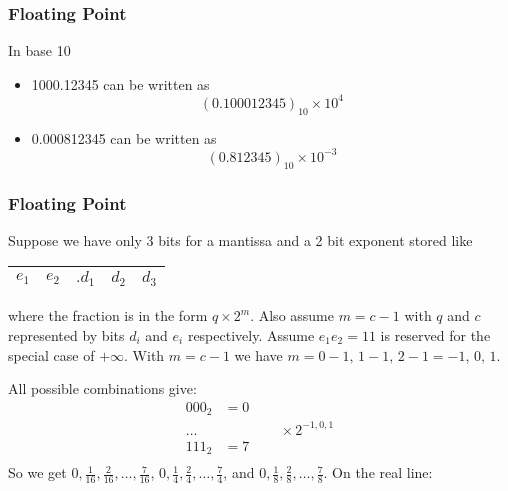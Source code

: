 \documentclass[10pt]{beamer}
\begin{document}
\begin{frame}
\frametitle{Floating Point}
\begin{example}
  In base 10
\begin{itemize}
  \item 1000.12345 can be written as
\begin{equation*}
  (0.100012345)_{10} \times 10^4
\end{equation*}
  \item 0.000812345 can be written as
\begin{equation*}
  (0.812345)_{10} \times 10^{-3}
\end{equation*}
\end{itemize}
\end{example}
\end{frame}
\begin{frame}
\frametitle{Floating Point}
  Suppose we have only 3 bits for a mantissa and a 2 bit exponent stored
like

\begin{center}
\begin{tabular}{|c|c||c|c|c|}\hline
  $e_1$ & $e_2$ & $.d_1$ & $d_2$ & $d_3$ \\\hline
\end{tabular}
\end{center}
where the fraction is in the form $q \times 2^{m}$.  Also assume $m=c-1$ with
$q$ and $c$ represented by bits $d_i$ and $e_i$ respectively.  Assume $e_1e_2
=11$ is reserved for the special case of $+\infty$.  With $m=c-1$ we have
$m=0-1,\, 1-1,\, 2-1=-1,\, 0,\, 1$.

All possible combinations give:
\begin{align*}
000_2 & = 0\\
\dots & \qquad\qquad \times 2^{-1,0,1}\\
111_2 & = 7\\
\end{align*}
So we get $0,\frac{1}{16},\frac{2}{16},\dots,\frac{7}{16}$, 
$0,\frac{1}{4},\frac{2}{4},\dots,\frac{7}{4}$, 
and $0,\frac{1}{8},\frac{2}{8},\dots,\frac{7}{8}$.  On the real line:

\begin{center}
\end{center}

\end{frame}
\end{document}
